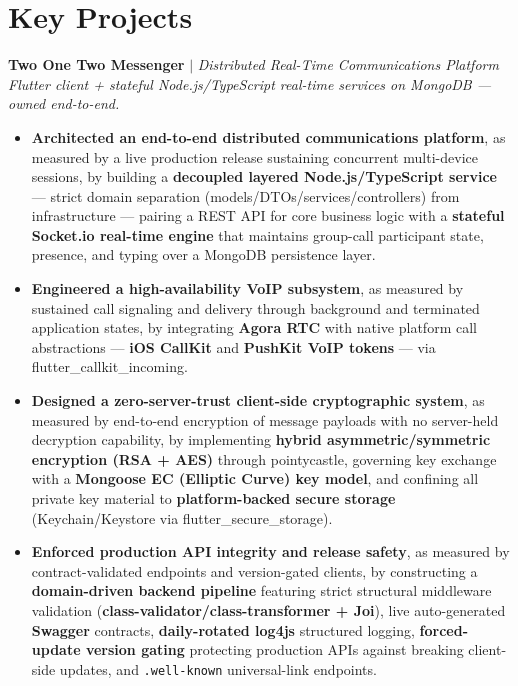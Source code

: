 \documentclass[10pt,letterpaper]{article}
\newenvironment{highlights}{
  \begin{itemize}[topsep=2pt,parsep=1pt,partopsep=0pt,itemsep=0pt,leftmargin=10pt]
}{\end{itemize}}
\begin{document}
\vspace{5pt}

\section{Key Projects}

\textbf{Two One Two Messenger} $|$ \textit{Distributed Real-Time Communications Platform}
\hfill
\href{https://play.google.com/store/apps/details?id=com.freshcodes.twoonetwomessenger}{\textcolor{myblue}{\faGooglePlay}}\\
\textit{Flutter client + stateful Node.js/TypeScript real-time services on MongoDB — owned end-to-end.}
\begin{highlights}
  \item \textbf{Architected an end-to-end distributed communications platform}, as measured by a live production release sustaining concurrent multi-device sessions, by building a \textbf{decoupled layered Node.js/TypeScript service} — strict domain separation (models/DTOs/services/controllers) from infrastructure — pairing a REST API for core business logic with a \textbf{stateful Socket.io real-time engine} that maintains group-call participant state, presence, and typing over a MongoDB persistence layer.
  \item \textbf{Engineered a high-availability VoIP subsystem}, as measured by sustained call signaling and delivery through background and terminated application states, by integrating \textbf{Agora RTC} with native platform call abstractions — \textbf{iOS CallKit} and \textbf{PushKit VoIP tokens} — via flutter\_callkit\_incoming.
  \item \textbf{Designed a zero-server-trust client-side cryptographic system}, as measured by end-to-end encryption of message payloads with no server-held decryption capability, by implementing \textbf{hybrid asymmetric/symmetric encryption (RSA + AES)} through pointycastle, governing key exchange with a \textbf{Mongoose EC (Elliptic Curve) key model}, and confining all private key material to \textbf{platform-backed secure storage} (Keychain/Keystore via flutter\_secure\_storage).
  \item \textbf{Enforced production API integrity and release safety}, as measured by contract-validated endpoints and version-gated clients, by constructing a \textbf{domain-driven backend pipeline} featuring strict structural middleware validation (\textbf{class-validator/class-transformer + Joi}), live auto-generated \textbf{Swagger} contracts, \textbf{daily-rotated log4js} structured logging, \textbf{forced-update version gating} protecting production APIs against breaking client-side updates, and \texttt{.well-known} universal-link endpoints.

\end{highlights}
\end{document}

